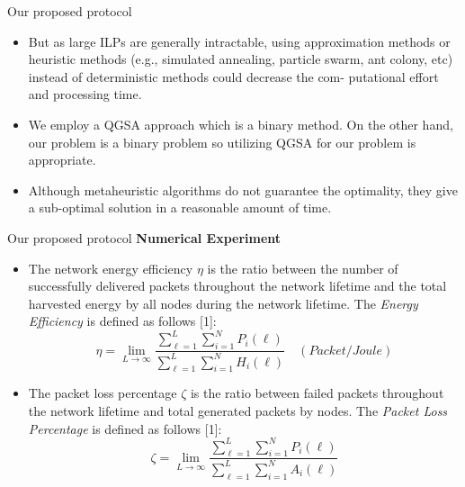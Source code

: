 \documentclass{beamer}
\begin{document}
\begin{frame}[t]{Our proposed protocol} %
\begin{itemize}
\small
\justifying
\item But as large ILPs are generally intractable, using approximation methods or heuristic methods (e.g., simulated annealing, particle swarm, ant colony, etc) instead of deterministic methods could decrease the com- putational effort and processing time.
\item We employ a QGSA approach which is a binary method. On the other hand, our problem is a binary problem so utilizing QGSA for our problem is appropriate.
\item Although metaheuristic algorithms do not guarantee the optimality, they give a sub-optimal solution in a reasonable amount of time.

\end{itemize}
\end{frame}


\begin{frame}[t]{Our proposed protocol} %
\textbf{Numerical Experiment}
\begin{itemize}
\small
\justifying
\item The network energy efficiency $\eta$ is the ratio between the number of successfully delivered packets throughout the network lifetime and the total harvested energy by all nodes during the network lifetime. The \emph{Energy Efficiency} is defined as follows [1]:
\begin{equation}
\eta=\lim_{L\to\infty}\frac{\sum_{\ell=1}^{L}\sum_{i=1}^{N}P_{i}(\ell)}{\sum_{\ell=1}^{L}\sum_{i=1}^{N}H_{i}(\ell)} \quad (Packet/Joule)
\end{equation}
\item The packet loss percentage $\zeta$ is the ratio between failed packets throughout the network lifetime and total generated packets by nodes. The \emph{Packet Loss Percentage} is defined as follows [1]:
\begin{equation}
\zeta=\lim_{L\to\infty}\frac{\sum_{\ell=1}^{L}\sum_{i=1}^{N}P_{i}(\ell)}{\sum_{\ell=1}^{L}\sum_{i=1}^{N}A_{i}(\ell)} 
\end{equation}
\end{itemize}
\end{frame}
\end{document}
